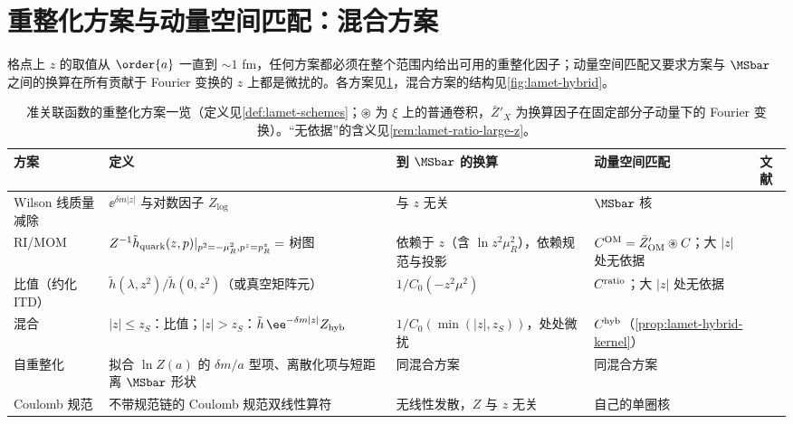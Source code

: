 \section{重整化方案与动量空间匹配：混合方案}\label{sec:lamet-schemes}

格点上 $z$ 的取值从 $\order{a}$ 一直到 $\sim1$ fm，任何方案都必须在整个范围内给出可用的重整化因子；动量空间匹配又要求方案与 $\MSbar$ 之间的换算在所有贡献于 Fourier 变换的 $z$ 上都是微扰的。各方案见\cref{tab:lamet-schemes}，混合方案的结构见\cref{fig:lamet-hybrid}。

\begin{table}[htbp]
\centering
\footnotesize
\renewcommand{\arraystretch}{1.12}
\begin{tabularx}{\textwidth}{@{}>{\raggedright\arraybackslash}p{1.8cm}>{\raggedright\arraybackslash}X>{\raggedright\arraybackslash}p{2.75cm}>{\raggedright\arraybackslash}p{2.6cm}>{\raggedright\arraybackslash}p{2.1cm}@{}}
\toprule
方案 & 定义 & 到 $\MSbar$ 的换算 & 动量空间匹配 & 文献 \\
\midrule
Wilson 线质量减除 & $\ee^{\delta m|z|}$ 与对数因子 $Z_{\log}$ & 与 $z$ 无关 & $\MSbar$ 核 & \cite{Chen:2016fxx,Ishikawa:2016znu,Green:2017xeu} \\
RI/MOM & $Z^{-1}\tilde h_{\rm quark}(z,p)|_{p^2=-\mu_R^2,p^z=p^z_R}=$ 树图 & 依赖于 $z$（含 $\ln z^2\mu_R^2$），依赖规范与投影 & $C^{\rm OM}=\bar Z'_{\rm OM}\circledast C$；大 $|z|$ 处无依据 & \cite{Constantinou:2017sej,Stewart:2017tvs,Alexandrou:2017huk,Chen:2017mzz,LatticeParton:2018gjr} \\
比值（约化 ITD） & $\tilde h(\lambda,z^2)/\tilde h(0,z^2)$（或真空矩阵元） & $1/C_0(-z^2\mu^2)$ & $C^{\rm ratio}$；大 $|z|$ 处无依据 & \cite{Radyushkin2017,Orginos:2017kos,Braun:2018brg} \\
混合 & $|z|\le z_S$：比值；$|z|>z_S$：$\tilde h\,\ee^{-\delta m|z|}Z_{\rm hyb}$ & $1/C_0(\min(|z|,z_S))$，处处微扰 & $C^{\rm hyb}$（\cref{prop:lamet-hybrid-kernel}） & \cite{Ji:2020brr} \\
自重整化 & 拟合 $\ln Z(a)$ 的 $\delta m/a$ 型项、离散化项与短距离 $\MSbar$ 形状 & 同混合方案 & 同混合方案 & \cite{LatticePartonLPC:2021gpi} \\
Coulomb 规范 & 不带规范链的 Coulomb 规范双线性算符 & 无线性发散，$Z$ 与 $z$ 无关 & 自己的单圈核 & \cite{Gao:2023lny,Zhao:2023ptv} \\
\bottomrule
\end{tabularx}
\caption{准关联函数的重整化方案一览（定义见\cref{def:lamet-schemes}；$\circledast$ 为 $\xi$ 上的普通卷积，$\bar Z'_X$ 为换算因子在固定部分子动量下的 Fourier 变换）。“无依据”的含义见\cref{rem:lamet-ratio-large-z}。}
\label{tab:lamet-schemes}
\end{table}

